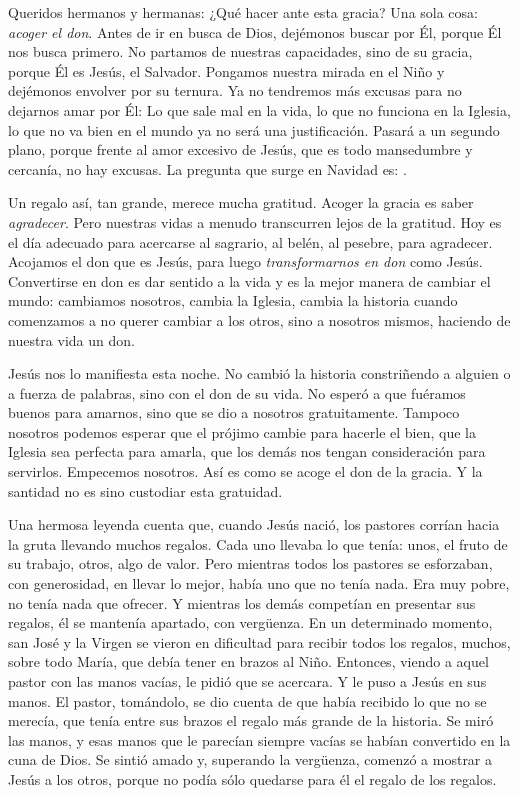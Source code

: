 \begin{body}
\begin{body}
Queridos hermanos y hermanas: ¿Qué hacer ante esta gracia? Una sola cosa: \emph{acoger el don}. Antes de ir en busca de Dios, dejémonos buscar por Él, porque Él nos busca primero. No partamos de nuestras capacidades, sino de su gracia, porque Él es Jesús, el Salvador. Pongamos nuestra mirada en el Niño y dejémonos envolver por su ternura. Ya no tendremos más excusas para no dejarnos amar por Él: Lo que sale mal en la vida, lo que no funciona en la Iglesia, lo que no va bien en el mundo ya no será una justificación. Pasará a un segundo plano, porque frente al amor excesivo de Jesús, que es todo mansedumbre y cercanía, no hay excusas. La pregunta que surge en Navidad es: .

Un regalo así, tan grande, merece mucha gratitud. Acoger la gracia es saber \emph{agradecer}. Pero nuestras vidas a menudo transcurren lejos de la gratitud. Hoy es el día adecuado para acercarse al sagrario, al belén, al pesebre, para agradecer. Acojamos el don que es Jesús, para luego \emph{transformarnos en don} como Jesús. Convertirse en don es dar sentido a la vida y es la mejor manera de cambiar el mundo: cambiamos nosotros, cambia la Iglesia, cambia la historia cuando comenzamos a no querer cambiar a los otros, sino a nosotros mismos, haciendo de nuestra vida un don.

Jesús nos lo manifiesta esta noche. No cambió la historia constriñendo a alguien o a fuerza de palabras, sino con el don de su vida. No esperó a que fuéramos buenos para amarnos, sino que se dio a nosotros gratuitamente. Tampoco nosotros podemos esperar que el prójimo cambie para hacerle el bien, que la Iglesia sea perfecta para amarla, que los demás nos tengan consideración para servirlos. Empecemos nosotros. Así es como se acoge el don de la gracia. Y la santidad no es sino custodiar esta gratuidad.

Una hermosa leyenda cuenta que, cuando Jesús nació, los pastores corrían hacia la gruta llevando muchos regalos. Cada uno llevaba lo que tenía: unos, el fruto de su trabajo, otros, algo de valor. Pero mientras todos los pastores se esforzaban, con generosidad, en llevar lo mejor, había uno que no tenía nada. Era muy pobre, no tenía nada que ofrecer. Y mientras los demás competían en presentar sus regalos, él se mantenía apartado, con vergüenza. En un determinado momento, san José y la Virgen se vieron en dificultad para recibir todos los regalos, muchos, sobre todo María, que debía tener en brazos al Niño. Entonces, viendo a aquel pastor con las manos vacías, le pidió que se acercara. Y le puso a Jesús en sus manos. El pastor, tomándolo, se dio cuenta de que había recibido lo que no se merecía, que tenía entre sus brazos el regalo más grande de la historia. Se miró las manos, y esas manos que le parecían siempre vacías se habían convertido en la cuna de Dios. Se sintió amado y, superando la vergüenza, comenzó a mostrar a Jesús a los otros, porque no podía sólo quedarse para él el regalo de los regalos.


\end{body}
\end{body}
